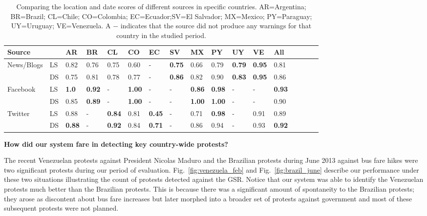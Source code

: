 \documentclass[letterpaper]{article}
\begin{document}
\begin{table} %
  \footnotesize
\centering
\caption{\small Comparing the location and date scores of different sources in specific countries.
AR=Argentina; BR=Brazil; CL=Chile; CO=Colombia; EC=Ecuador;SV=El
Salvador; MX=Mexico; PY=Paraguay; UY=Uruguay; VE=Venezuela. A $-$
indicates that the source did not produce any warnings for that country
in the studied period.} \label{tb:modelwisecomparison}
\begin{tabularx}{.9\textwidth}{p{1.7cm}*{16}{X}}
\toprule
Source& & AR & BR & CL & CO & EC & SV & MX & PY & UY & VE & All\\
\midrule
\multirow{2}{*}{News/Blogs} &LS &0.82&0.76&0.75&0.60&-&{\bf0.75}&0.66&0.79&{\bf0.79}&{\bf0.95}&0.81\\
                            &DS&0.75&0.81&0.78&0.77&-&{\bf0.86}&0.82&0.90&{\bf0.83}&{\bf0.95}&0.86\\
\midrule
\multirow{2}{*}{Facebook} &LS &{\bf1.0}&{\bf0.92}&-&{\bf1.00}&-&-&{\bf0.86}&{\bf0.98}&-&-&{\bf0.93}\\
                          &DS&0.85&{\bf0.89}&-&{\bf1.00}&-&-&{\bf1.00}&{\bf1.00}&-&-&0.90\\
\midrule
\multirow{2}{*}{Twitter} &LS &0.88&-&{\bf0.84}&0.81&{\bf0.45}&-&0.71&{\bf0.98}&-&0.91&0.89\\
                         &DS&{\bf0.88}&-&{\bf0.92}&0.84&{\bf0.71}&-&0.86&0.94&-&0.93&{\bf0.92}\\
\bottomrule
\end{tabularx}
\end{table}

\noindent
{\bf How did our system fare in detecting key country-wide protests?}

The recent Venezuelan protests against President Nicolas Maduro and the
Brazilian protests during June 2013 against bus fare hikes were two
significant protests during our period of evaluation.
Fig.~\ref{fig:venezuela_feb} and Fig.~\ref{fig:brazil_june} describe our
performance under these two situations illustrating the count of
protests detected against the GSR. Notice that our system was able to
identify the Venezuelan protests much better than the Brazilian
protests. This is because there was a significant amount of spontaneity
to the Brazilian protests; they arose as discontent about bus fare
increases but later morphed into a broader set of protests against
government and most of these subsequent protests were not planned.\\
\end{document}
